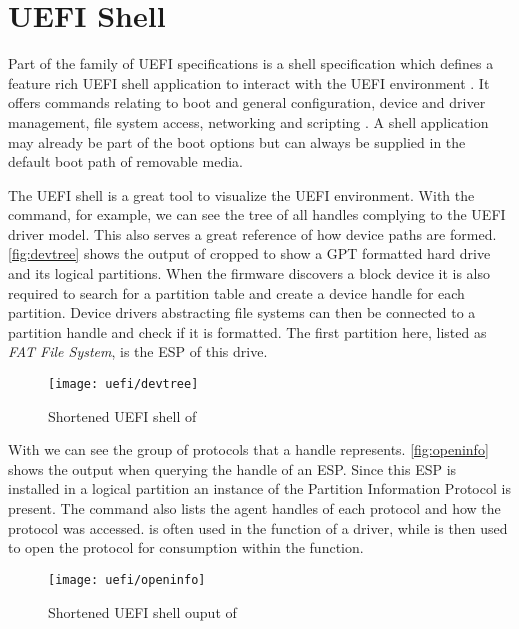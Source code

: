 
\section{\acs{UEFI} Shell}

Part of the family of \ac{UEFI} specifications is a shell specification which defines a feature rich \ac{UEFI} shell application to interact with the \ac{UEFI} environment \cite[Section 1.1]{uefi-shell-spec}.
It offers commands relating to boot and general configuration, device and driver management, file system access, networking \cite[Section 5.1]{uefi-shell-spec} and scripting \cite[Section 4]{uefi-shell-spec}.
A shell application may already be part of the boot options but can always be supplied in the default boot path of removable media.

The \ac{UEFI} shell is a great tool to visualize the \ac{UEFI} environment.
With the  command, for example, we can see the tree of all handles complying to the \ac{UEFI} driver model.
This also serves a great reference of how device paths are formed.
\autoref{fig:devtree} shows the output of  cropped to show a \ac{GPT} formatted hard drive and its logical partitions.
When the firmware discovers a block device it is also required to search for a partition table and create a device handle for each partition.
Device drivers abstracting file systems can then be connected to a partition handle and check if it is formatted.
The first partition here, listed as \emph{FAT File System}, is the \ac{ESP} of this drive.

\begin{figure}[htb]
    \centering
    \texttt{[image: uefi/devtree]}
    \caption{Shortened \ac{UEFI} shell of }
    \label{fig:devtree}
\end{figure}

With  we can see the group of protocols that a handle represents.
\autoref{fig:openinfo} shows the output when querying the handle of an \ac{ESP}.
Since this \ac{ESP} is installed in a logical partition an instance of the Partition Information Protocol is present.
The command also lists the agent handles of each protocol and how the protocol was accessed.
 is often used in the  function of a driver, while  is then used to open the protocol for consumption within the  function.

\begin{figure}[htb]
    \centering
    \texttt{[image: uefi/openinfo]}
    \caption{Shortened \ac{UEFI} shell ouput of }
    \label{fig:openinfo}
\end{figure}



